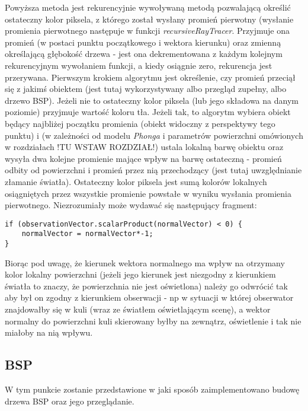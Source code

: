 Powyższa metoda jest rekurencyjnie wywoływaną metodą pozwalającą określić ostateczny kolor piksela, z którego został wysłany promień pierwotny (wysłanie promienia pierwotnego następuje w funkcji \emph{recursiveRayTracer}. Przyjmuje ona promień (w postaci punktu początkowego i wektora kierunku) oraz zmienną określającą głębokość drzewa - jest ona dekrementowana z każdym kolejnym rekurencyjnym wywołaniem funkcji, a kiedy osiągnie zero, rekurencja jest przerywana. Pierwszym krokiem algorytmu jest określenie, czy promień przeciął się z jakimś obiektem (jest tutaj wykorzystywany albo przegląd zupełny, albo drzewo BSP). Jeżeli nie to ostateczny kolor piksela (lub jego składowa na danym poziomie) przyjmuje wartość koloru tła. Jeżeli tak, to algorytm wybiera obiekt będący najbliżej początku promienia (obiekt widoczny z perspektywy tego punktu) i (w zależności od modelu \emph{Phonga} i parametrów powierzchni omówionych w rozdziałach !TU WSTAW ROZDZIAŁ!) ustala lokalną barwę obiektu oraz wysyła dwa kolejne promienie mające wpływ na barwę ostateczną - promień odbity od powierzchni i promień przez nią przechodzący (jest tutaj uwzględnianie złamanie światła).
Ostateczny kolor piksela jest sumą kolorów lokalnych osiągniętych przez wszystkie promienie powstałe w wyniku wysłania promienia pierwotnego.	Niezrozumiały może wydawać się następujący fragment:

\begin{lstlisting}
if (observationVector.scalarProduct(normalVector) < 0) {
    normalVector = normalVector*-1;
}
\end{lstlisting}

Biorąc pod uwagę, że kierunek wektora normalnego ma wpływ na otrzymany kolor lokalny powierzchni (jeżeli jego kierunek jest niezgodny z kierunkiem światła to znaczy, że powierzchnia nie jest oświetlona) należy go odwrócić tak aby był on zgodny z kierunkiem obserwacji - np w sytuacji w której obserwator znajdowałby się w kuli (wraz ze światłem oświetlającym scenę), a wektor normalny do powierzchni kuli skierowany byłby na zewnątrz, oświetlenie i tak nie miałoby na nią wpływu.

\subsection{BSP}

W tym punkcie zostanie przedstawione w jaki sposób zaimplementowano budowę drzewa BSP oraz jego przeglądanie.

